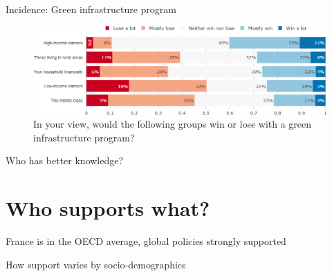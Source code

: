 \begin{framefont}{\small}
\begin{frame}{Incidence: Green infrastructure program}%
	\begin{figure}[h!]
	\centering
	\caption{In your view, would the following groups win or lose with a green infrastructure program?}
	\includegraphics[width=.87\paperwidth]{../figures/FR/investments_win_lose_FR.png}
	\end{figure}
\end{frame}
	

\begin{frame}{Who has better knowledge?}
\end{frame}

\section{Who supports what?}%

\begin{frame}{France is in the OECD average, global policies strongly supported}
\end{frame}


\begin{frame}{How support varies by socio-demographics}
\end{frame}


\end{framefont}

